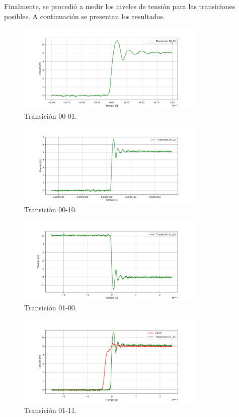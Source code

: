 Finalmente, se procedió a medir los niveles de tensión para las transiciones posibles. A continuación se presentan los resultados.
\begin{figure}[H]
	\centering
	\includegraphics[width=0.8\textwidth]{ImagenesEjercicio1/00-01.PNG}
	\caption{Transición 00-01.}
	\label{fig:0001}
\end{figure}
\begin{figure}[H]
	\centering
	\includegraphics[width=0.8\textwidth]{ImagenesEjercicio1/00-10.PNG}
	\caption{Transición 00-10.}
	\label{fig:0010}
\end{figure}
\begin{figure}[H]
	\centering
	\includegraphics[width=0.8\textwidth]{ImagenesEjercicio1/01-00.PNG}
	\caption{Transición 01-00.}
	\label{fig:0100}
\end{figure}
\begin{figure}[H]
	\centering
	\includegraphics[width=0.8\textwidth]{ImagenesEjercicio1/01-11.PNG}
	\caption{Transición 01-11.}
	\label{fig:0111}
\end{figure}
